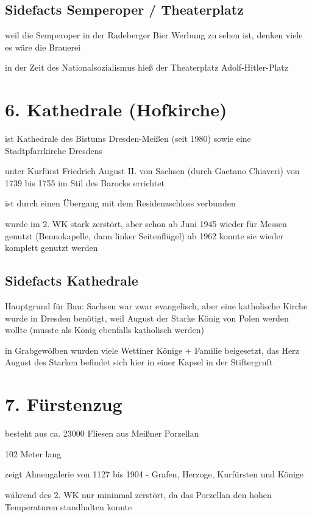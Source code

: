 \documentclass[a4paper,12pt]{report}
\begin{document}
\subsection{Sidefacts Semperoper / Theaterplatz}
\begin{itemize*}
\item weil die Semperoper in der Radeberger Bier Werbung zu sehen ist, denken viele es wäre die Brauerei
\item in der Zeit des Nationalsozialismus hieß der Theaterplatz Adolf-Hitler-Platz
\end{itemize*}

\section{6. Kathedrale (Hofkirche)}
\begin{itemize*}
\item ist Kathedrale des Bistums Dresden-Meißen (seit 1980) sowie eine Stadtpfarrkirche Dresdens
\item unter Kurfürst Friedrich August II. von Sachsen (durch Gaetano Chiaveri) von 1739 bis 1755 im Stil des Barocks errichtet
\item ist durch einen Übergang mit dem Residenzschloss verbunden
\item wurde im 2. WK stark zerstört, aber schon ab Juni 1945 wieder für Messen genutzt (Bennokapelle, dann linker Seitenflügel) ab 1962 konnte sie wieder komplett genutzt werden
\end{itemize*}
\subsection{Sidefacts Kathedrale}
\begin{itemize*}
\item Hauptgrund für Bau: Sachsen war zwar evangelisch, aber eine katholische Kirche wurde in Dresden benötigt, weil August der Starke König von Polen werden wollte (musste als König ebenfalls katholisch werden)
\item in Grabgewölben wurden viele Wettiner Könige + Familie beigesetzt, das Herz August des Starken befindet sich hier in einer Kapsel in der Stiftergruft
\end{itemize*}

\section{7. Fürstenzug}
\begin{itemize*}
\item besteht aus ca. 23000 Fliesen aus Meißner Porzellan
\item 102 Meter lang
\item zeigt Ahnengalerie von 1127 bis 1904 - Grafen, Herzoge, Kurfürsten und Könige
\item während des 2. WK nur mininmal zerstört, da das Porzellan den hohen Temperaturen standhalten konnte
\end{itemize*}
\end{document}
